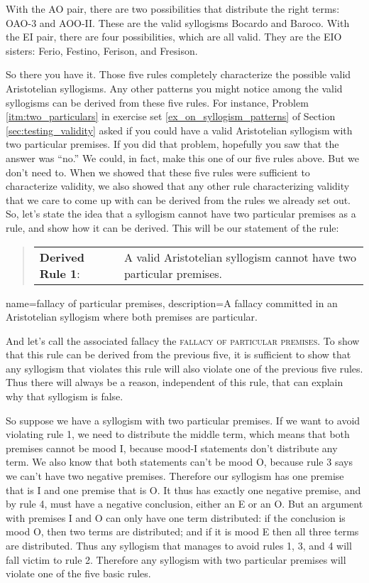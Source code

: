 With the AO pair, there are two possibilities that distribute the right terms: OAO-3 and AOO-II. These are the valid syllogisms Bocardo and Baroco. With the EI pair, there are four possibilities, which are all valid. They are the EIO sisters: Ferio, Festino, Ferison, and Fresison. 

So there you have it. Those five rules completely characterize the possible valid Aristotelian syllogisms. Any other patterns you might notice among the valid syllogisms can be derived from these five rules. For instance, Problem \ref{itm:two_particulars} in exercise set \ref{ex_on_syllogism_patterns} of Section \ref{sec:testing_validity} asked if you could have a valid Aristotelian syllogism with two particular premises. If you did that problem, hopefully you saw that the answer was ``no.'' We could, in fact, make this one of our five rules above. But we don't need to. When we showed that these five rules were sufficient to characterize validity, we also showed that any other rule characterizing validity that we care to come up with can be derived from the rules we already set out. So, let's state the idea that a syllogism cannot have two particular premises as a rule, and show how it can be derived. This will be our statement of the rule:

 \begin{quotation}
\begin{tabu}{p{.25\linewidth}p{.75\linewidth}}
\textbf{Derived Rule 1}: &  A valid Aristotelian syllogism cannot have two particular premises. 
\end{tabu}\label{derived_rule_1}
\end{quotation}

{
name=fallacy of particular premises,
description={A fallacy committed in an Aristotelian syllogism where both premises are particular.}
}

And let's call the associated fallacy the \textsc{\gls{fallacy of particular premises}}. \label{def:particular_premises} To show that this rule can be derived from the previous five, it is sufficient to show that any syllogism that violates this rule will also violate one of the previous five rules. Thus there will always be a reason, independent of this rule, that can explain why that syllogism is false. 

So suppose we have a syllogism with two particular premises. If we want to avoid violating rule 1, we need to distribute the middle term, which means that both premises cannot be mood I, because mood-I statements don't distribute any term. We also know that both statements can't be mood O, because rule 3 says we can't have two negative premises. Therefore our syllogism has one premise that is I and one premise that is O. It thus has exactly one negative premise, and by rule 4, must have a negative conclusion, either an E or an O. But an argument with premises I and O can only have one term distributed: if the conclusion is mood O, then two terms are distributed; and if it is mood E then all three terms are distributed. Thus any syllogism that manages to avoid rules 1, 3, and 4 will fall victim to rule 2. Therefore any syllogism with two particular premises will violate one of the five basic rules. 

